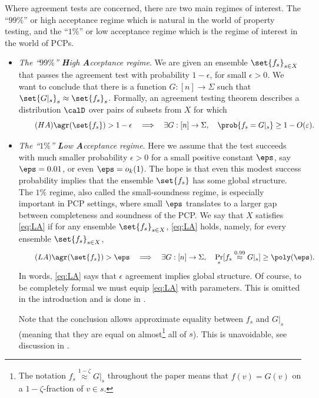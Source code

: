 \documentclass{article}[11pt]
\begin{document}
Where agreement tests are concerned, there are two main regimes of interest. The ``$99\%$'' or high acceptance regime which is natural in the world of property testing, and the ``$1\%$'' or low acceptance regime which is the regime of interest in the world of PCPs.
\begin{itemize}
    \item \textit{The ``$99\%$'' \textbf{H}igh \textbf{A}cceptance regime}. We are given an ensemble $\set{f_s}_{s\in X}$ that passes the agreement test with probability $1-\epsilon$, for small $\epsilon>0$. We want to conclude that there is a function $G:[n]\to\Sigma$ such that $\set{G|_s}_s \approx \set{f_s}_s$. Formally, an agreement testing theorem describes a distribution $\calD$ over pairs of subsets from $X$ for which
    \begin{equation}\label{eq:99p}\tag{$HA$}
        \agr (\set{f_s})> 1-\epsilon \quad \Longrightarrow  \quad \exists G:[n]\to\Sigma,\quad \prob{f_s = G|_s} \geq 1-O(\varepsilon) .
    \end{equation}
    \item \textit{The ``$1\%$'' \textbf{L}ow \textbf{A}cceptance regime}. Here we assume that the test succeeds with much smaller probability $\epsilon>0$ for a small positive constant $\eps$, say $\eps=0.01$, or even $\eps = o_k(1)$. The hope is that even this modest success probability implies that the ensemble $\set{f_s}$ has some global structure.
    The $1\%$ regime, also called the small-soundness regime, is especially important in PCP settings, where small $\eps$ translates to a larger gap between completeness and soundness of the PCP.  
    We say that $X$ satisfies \eqref{eq:LA} if for any ensemble $\set{f_s}_{s\in X}$, \eqref{eq:LA} holds,
    namely, for every ensemble $\set{f_s}_{s\in X}$, 
    \begin{equation}\label{eq:LA}\tag{$LA$}
    \agr (\set{f_s}) > \eps  \quad \Longrightarrow \quad \exists G:[n]\to\Sigma,\quad \Pr_s[f_s\overset{0.99}{\approx} G|_s]\geq\poly(\eps).
\end{equation}
In words, \eqref{eq:LA} says that $\epsilon$ agreement implies global structure. 
%
{Of course, to be completely formal we must equip \eqref{eq:LA} with parameters. This is omitted in the introduction and is done in .} 

Note that the conclusion allows approximate equality between $f_s$ and $G|_s$ (meaning that they are equal on almost\footnote{The notation \(f_s \overset{1-\zeta}{\approx} G|_s\) throughout the paper means that \(f(v)=G(v)\) on a \(1-\zeta\)-fraction of \(v\in s\).} all of $s$). This is unavoidable, see discussion in \cite{DinurG2008}. 
\end{itemize}
\end{document}
